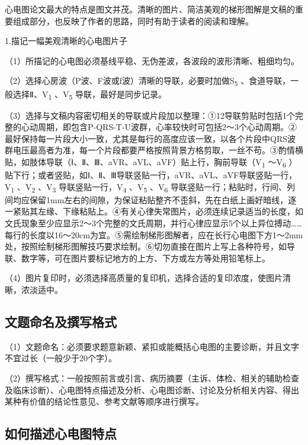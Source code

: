 心电图论文最大的特点是图文并茂。清晰的图片、简洁美观的梯形图解是文稿的重要组成部分，也反映了作者的思路，同时有助于读者的阅读和理解。

1.描记一幅美观清晰的心电图片子

（1）所描记的心电图必须基线平稳、无伪差波，各波段的波形清晰、粗细均匀。

（2）选择心房波（P波、F波或f波）清晰的导联，必要时加做S\textsubscript{5}
、食道导联，一般选择Ⅱ、V\textsubscript{1} 、V\textsubscript{5}
导联，最好是同步记录。

（3）选择与文稿内容密切相关的导联或片段加以整理：①12导联剪贴时包括1个完整的心动周期，即包含P-QRS-T-U波群，心率较快时可包括2～3个心动周期。②最好保持每一片段大小一致，尤其是每行的高度应该一致，以各个片段中QRS波群电压最高者为准，每一个片段都要严格按照背景方格剪取，一丝不苟。③酌情横贴，如肢体导联（Ⅰ、Ⅱ、Ⅲ、aVR、aVL、aVF）贴上行，胸前导联（V\textsubscript{1}
～V\textsubscript{6}
）贴下行；或者竖贴，如Ⅰ、Ⅱ、Ⅲ导联竖贴一行，aVR、aVL、aVF导联竖贴一行，V\textsubscript{1}
、V\textsubscript{2} 、V\textsubscript{3}
导联竖贴一行，V\textsubscript{4} 、V\textsubscript{5}
、V\textsubscript{6}
导联竖贴一行；粘贴时，行间、列间均应保留1mm左右的间隙，为保证粘贴整齐不歪斜，先在白纸上画好暗线，逐一紧贴其左缘、下缘粘贴上。④有关心律失常图片，必须连续记录适当的长度，如文氏现象至少应显示2～3个完整的文氏周期，并行心律应显示5个以上异位搏动\ldots{}\ldots{}每行的长度以16～20cm为宜。⑤需绘制梯形图解者，应在长行心电图下方1～2mm处，按照绘制梯形图解技巧要求绘制。⑥切勿直接在图片上写上各种符号，如导联、数字等，可在图片要标记地方的上方、下方或左方等处用铅笔标上。

（4）图片复印时，必须选择高质量的复印机，选择合适的复印浓度，使图片清晰，浓淡适中。

\protect\hypertarget{text00058.htmlux5cux23subid712}{}{}

\subsection{文题命名及撰写格式}

（1）文题命名：必须要求题意新颖、紧扣或能概括心电图的主要诊断，并且文字不宜过长（一般少于20个字）。

（2）撰写格式：一般按照前言或引言、病历摘要（主诉、体检、相关的辅助检查及临床诊断）、心电图特点描述及分析、心电图诊断、讨论及分析相关内容、得出某种有价值的结论性意见、参考文献等顺序进行撰写。

\protect\hypertarget{text00058.htmlux5cux23subid713}{}{}

\subsection{如何描述心电图特点}

